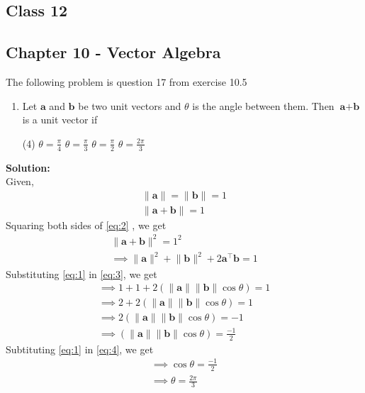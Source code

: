 \documentclass{article}
\newcommand{\norm}[1]{\lVert#1\rVert}
\renewcommand{\vec}[1]{\textbf{#1}}
\begin{document}
\onehalfspacing
\begin{center}
	\section*{\textbf{Class 12}}
	\subsection*{Chapter 10 - Vector Algebra}
\end{center}
The following problem is question 17 from exercise 10.5

\begin{enumerate}
	\item Let $\vec{a}$ and $\vec{b}$ be two unit vectors and $\theta$ is the angle between them. Then $\vec{a}+\vec{b}$ is a unit vector if
		\begin{tasks}(4)
			\task $\theta = \frac{\pi}{4}$
			\task $\theta = \frac{\pi}{3}$
			\task $\theta = \frac{\pi}{2}$
			\task $\theta = \frac{2\pi}{3}$
			\end{tasks}
			
\end{enumerate}
	\textbf{Solution:}
\\
Given,
\begin{align}
	\norm{\vec{a}}=\norm{\vec{b}}=1\label{eq:1}
	\\
	\norm{\vec{a}+\vec{b}}=1\label{eq:2}
\end{align}
Squaring both sides of \eqref{eq:2}  , we get
\begin{align}
	\norm{\vec{a}+\vec{b}}^2=1^2
\\	
	\implies \norm{\vec{a}}^2 + \norm{\vec{b}}^2 + 2\vec{a}^{\top}\vec{b} = 1\label{eq:3}	
\end{align}
Substituting \eqref{eq:1} in \eqref{eq:3}, we get
\\
\begin{align}
	\implies 1+1+2(\norm{\vec{a}}\norm{\vec{b}}\cos{\theta})=1
	\\
	\implies 2+2(\norm{\vec{a}}\norm{\vec{b}}\cos{\theta})=1
        \\
	\implies 2(\norm{\vec{a}}\norm{\vec{b}}\cos{\theta})=-1
	\\
	\implies (\norm{\vec{a}}\norm{\vec{b}}\cos{\theta})=\frac{-1}{2}\label{eq:4}
\end{align}
Subtituting \eqref{eq:1} in \eqref{eq:4}, we get
\begin{align}
	\implies \cos{\theta}=\frac{-1}{2}
	\\
	\implies \theta=\frac{2\pi}{3}
\end{align}
\end{document}
